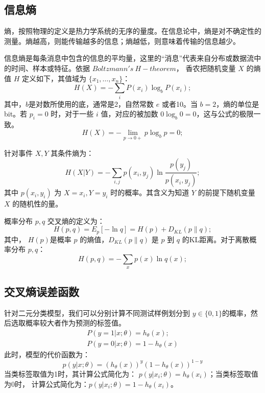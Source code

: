 \documentclass[oneside]{ZJUthesis}
\begin{document}
\subsection{信息熵}
熵，按照物理的定义是热力学系统的无序的量度。在信息论中，熵是对不确定性的测量。熵越高，则能传输越多的信息；熵越低，则意味着传输的信息越少。

信息熵是每条消息中包含的信息的平均量，这里的``消息''代表来自分布或数据流中的时间、样本或特征。依据 $Boltzmann's~H-theorem$， 香农把随机变量 $X$ 的熵值 $H$ 定义如下，其值域为 $\{x_1,\dots,x_n\}$：
\begin{equation}
	H(X)=-\sum\limits_i{P(x_i)\log_b P(x_i)};
\end{equation}
其中，$b$是对数所使用的底，通常是2，自然常数 $e$ 或者10。当 $b=2$，熵的单位是 bit。若 $p_i=0$ 时，对于一些 $i$ 值，对应的被加数 $0\log_b 0=0$，这与公式的极限一致。
\begin{equation}
	H(X)=-\lim\limits_{p\to 0+}{p\log_b p=0};
\end{equation}

针对事件 $X,Y$ 其条件熵为：
\begin{equation}
	H(X|Y)=-\sum\limits_{i,j}{p(x_i,y_j)\ln \frac{p(y_j)}{p(x_i,y_j)}};
\end{equation}
其中 $p(x_i,y_i)$ 为 $X=x_i,Y=y_i$ 时的概率。其含义为知道 $Y$ 的前提下随机变量 $X$ 的随机性的量。

概率分布 $p,q$ 交叉熵的定义为：
\begin{equation}
	H(p,q)=E_p [-\ln q]= H(p)+D_{KL}(p\|q);
\end{equation}
其中， $H(p)$是概率 $p$ 的熵值，$D_{KL}(p\|q)$ 是 $p$ 到 $q$ 的KL距离。对于离散概率分布 $p,q$：
\begin{equation}
	H(p,q)=-\sum\limits_{x}{p(x)\ln q(x)};
\end{equation}



\subsection{交叉熵误差函数}
针对二元分类模型，我们可以分别计算不同测试样例划分到 $y \in \{0,1\}$的概率，然后选取概率较大者作为预测的标签值。
\begin{equation}\begin{array}{l}
	P(y=1|x;\theta)=h_{\theta}(x);\\
	P(y=0|x;\theta)=1-h_{\theta}(x)
\end{array}\end{equation}
此时，模型的代价函数为：
\begin{equation}
p(y|x;\theta) = (h_{\theta}(x))^y(1-h_{\theta}(x))^{1-y}
\end{equation}
当类标签取值为1时，其计算公式简化为： $p(y|x_i;\theta)=h_{\theta}(x_i)$；当类标签取值为0时， 计算公式简化为：$p(y|x_i;\theta)=1- h_{\theta}(x_i)$。
\end{document}
